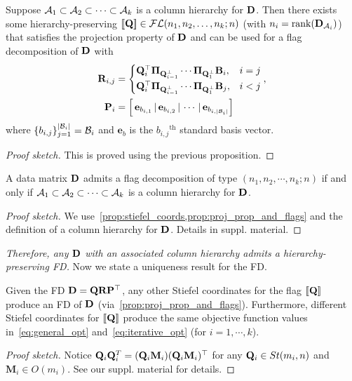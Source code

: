 \begin{prop}\label{prop:proj_prop_and_flags}
 Suppose $\mathcal{A}_1 \subset \mathcal{A}_2 \subset \cdots \subset \mathcal{A}_k$ is a column hierarchy for $\mathbf{D}$. Then there exists some hierarchy-preserving 
 $[\![\mathbf{Q}]\!] \in \mathcal{FL}(n_1,n_2,\dots, n_k;n)$ (with $n_i = \mathrm{rank}(\mathbf{D}_{\mathcal{A}_i})$) 
 that satisfies the projection property of $\mathbf{D}$ and can be used for a flag decomposition of $\mathbf{D}$ with
    \begin{align}
        \mathbf{R}_{i,j} &= 
        \begin{cases}
            \mathbf{Q}_i^\top\boldsymbol{\Pi}_{\mathbf{Q}_{i-1}^\perp}\cdots \boldsymbol{\Pi}_{\mathbf{Q}_1^\perp} \mathbf{B}_i, &i=j\\
            \mathbf{Q}_i^\top\boldsymbol{\Pi}_{\mathbf{Q}_{i-1}^\perp}\cdots \boldsymbol{\Pi}_{\mathbf{Q}_1^\perp} \mathbf{B}_j, &i < j
        \end{cases},\label{eq:onlyR}\\
        \mathbf{P}_i &= \left[ \,\mathbf{e}_{b_{i,1}}\,|\, \mathbf{e}_{b_{i,2}}\,|\, \cdots\,|\, \mathbf{e}_{b_{i,|\mathcal{B}_i|}} \right]\label{eq:onlyP}
    \end{align}
    where $\{b_{i,j}\}_{j=1}^{|\mathcal{B}_i|} = \mathcal{B}_i$ and $\mathbf{e}_{b}$ is the $b_{i,j}$$^{\mathrm{th}}$ standard basis vector.
\end{prop}
\begin{proof}[Proof sketch]
    This is proved using the previous proposition.
\end{proof}

\begin{prop}\label{prop:fd_def}
    A data matrix $\mathbf{D}$ admits a flag decomposition of type $(n_1,n_2, \cdots, n_k; n)$ if and only if $\mathcal{A}_1 \subset \mathcal{A}_2 \subset \cdots \subset \mathcal{A}_k$ is a column hierarchy for $\mathbf{D}$.
\end{prop}
\begin{proof}[Proof sketch]
    We use~\cref{prop:stiefel_coords,prop:proj_prop_and_flags} and the definition of a column hierarchy for $\mathbf{D}$. Details in suppl. material.
\end{proof}
\emph{Therefore, any $\mathbf{D}$ with an associated column hierarchy admits a hierarchy-preserving FD.} Now we state a uniqueness result for the FD.

\begin{prop}\label{prop:block_amb}
    Given the FD $\mathbf{D} = \mathbf{Q} \mathbf{R} \mathbf{P}^\top$, any other Stiefel coordinates for the flag $[\![\mathbf{Q}]\!]$ produce an FD of $\mathbf{D}$ (via~\cref{prop:proj_prop_and_flags}). Furthermore, different Stiefel coordinates for $[\![\mathbf{Q}]\!]$ produce the same objective function values in~\cref{eq:general_opt} and~\cref{eq:iterative_opt} (for $i=1,\cdots,k$).
\end{prop}
\begin{proof}[Proof sketch]
    Notice $\mathbf{Q}_i \mathbf{Q}_i^T = (\mathbf{Q}_i\mathbf{M}_i)  (\mathbf{Q}_i\mathbf{M}_i)^\top$ for any $\mathbf{Q}_i \in St(m_i,n)$ and $\mathbf{M}_i \in O(m_i)$. See our suppl. material for details.
\end{proof}



